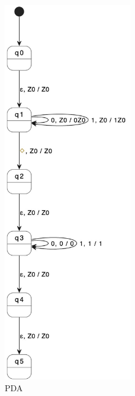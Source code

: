 \begin{figure}[hbt]
  \includegraphics[width=0.5\textwidth]{Immagini/t3}
  \caption{PDA}
\end{figure}
